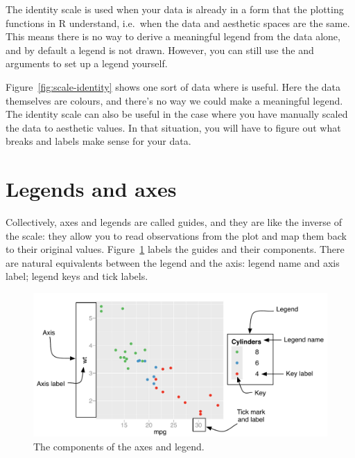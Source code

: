 The identity scale is used when your data is already in a form that the plotting functions in R understand, i.e.\ when the data and aesthetic spaces are the same.  This means there is no way to derive a meaningful legend from the data alone, and by default a legend is not drawn.  However, you can still use the  and  arguments to set up a legend yourself.

Figure~\ref{fig:scale-identity} shows one sort of data where  is useful.  Here the data themselves are colours, and there's no way we could make a meaningful legend.  The identity scale can also be useful in the case where you have manually scaled the data to aesthetic values.  In that situation, you will have to figure out what breaks and labels make sense for your data.

% 

\section{Legends and axes}
\label{sec:guides}

Collectively, axes and legends are called guides, and they are like the inverse of the scale: they allow you to read observations from the plot and map them back to their original values.  Figure~\ref{fig:labelled-guides} labels the guides and their components.  There are natural equivalents between the legend and the axis: legend name and axis label; legend keys and tick labels.

\begin{figure}[htbp]
  \centering
  \includegraphics[width=\textwidth]{scale-guides}
  
  \caption{The components of the axes and legend.}
  \label{fig:labelled-guides}
\end{figure}

